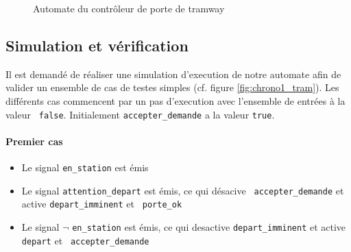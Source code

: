 \documentclass{article}
\begin{document}
      \begin{figure}
        \centering
        \caption{Automate du contrôleur de porte de tramway}
        \label{fig:autom_tram}
      \end{figure}

    \subsection{Simulation et vérification}
    
      Il est demandé de réaliser une simulation d'execution de notre automate
      afin de valider un ensemble de cas de testes simples (cf. figure
      \ref{fig:chrono1_tram}). Les différents cas commencent par un pas
      d'execution avec l'ensemble de entrées à la valeur {\tt
        false}. Initialement {\tt accepter\_demande} a la valeur {\tt true}.

      \paragraph{Premier cas}
        \begin{itemize}
          \item Le signal {\tt en\_station} est émis
          \item Le signal {\tt attention\_depart} est émis, ce qui désacive {\tt
            accepter\_demande} et active {\tt depart\_imminent} et {\tt
            porte\_ok}
          \item Le signal $\lnot$ {\tt en\_station} est émis, ce qui desactive
            {\tt depart\_imminent} et active {\tt depart} et {\tt
              accepter\_demande} 
        \end{itemize}
\end{document}
